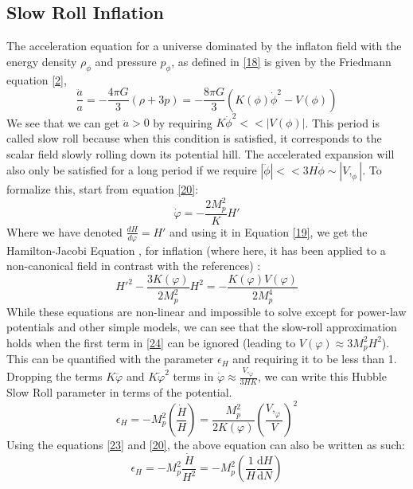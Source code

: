 \documentclass[aps,prd,reprint,preprintnumbers,showpacs,floatfix,nofootinbib,superscript address]{revtex4-2}
\begin{document}
\subsection{Slow Roll Inflation}
The acceleration equation for a universe dominated by the inflaton field with the energy density $\rho_{\phi}$ and pressure $p_{\phi}$, as defined in \ref{18} is given by the Friedmann equation \ref{2},
\begin{equation}
    \frac{\ddot{a}}{a} = -\frac{4\pi G}{3} (\rho +3p) = -\frac{8\pi G}{3} (K(\phi){\dot{\phi}}^2 - V(\phi)) 
\end{equation}
We see that we can get $\ddot{a} > 0$ by requiring $K\dot{\phi}^2 << |V(\phi)|$. This period is called slow roll because when this condition is satisfied, it corresponds to the scalar field slowly rolling down its potential hill. The accelerated expansion will also only be satisfied for a long period if we require $|\ddot{\phi}| << 3H\dot{\phi} \sim |V,_{\phi}|$. To formalize this, start from equation \ref{20}:
\begin{equation} \label{23}
    \dot{\varphi}  = -  \frac{2 M_p^2}{K} H'
\end{equation}
Where we have denoted $\frac{dH}{d\varphi} = H'$ and using it in Equation \ref{19}, we get the Hamilton-Jacobi Equation \cite{copeland1993reconstructing}, \cite{salopek1990nonlinear} for inflation (where here, it has been applied to a non-canonical field in contrast with the references) :
\begin{equation}    \label{24}
    H'^2 - \frac{3K(\varphi)}{2M_p^2}H^2 = - \frac{K(\varphi) V(\varphi)}{2M_p^4} 
\end{equation}
While these equations are non-linear and impossible to solve except for power-law potentials and other simple models, we can see that the slow-roll approximation holds when the first term in \ref{24} can be ignored (leading to $V(\varphi) \approx 3M_p^2H^2$). This can be quantified with the parameter $\epsilon_H$ and requiring it to be less than 1. Dropping the terms $K\ddot{\varphi}$ and $K\dot{\varphi}^2$ terms in \cite{16} $\dot{\varphi} \approx \frac{V,_\varphi}{3HK}$, we can write this Hubble Slow Roll parameter in terms of the potential.
\begin{equation}
    \epsilon_H = - M_p^2 \left(\frac{\dot{H}}{H} \right) = \frac{M_p^2}{2 K(\varphi)} \left(\frac{V,_\varphi}{V}\right)^2
\end{equation}
Using the equations \ref{23} and \ref{20}, the above equation can also be written as such:
\begin{equation} \label{26}
    \epsilon_H = - M_p^2  \frac{\dot{H}}{H^2} = - M_p^2 \left(\frac{1}{H}\frac{\text{d}H}{\text{d}N} \right)
\end{equation}
\end{document}

